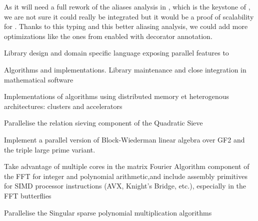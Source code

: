 \begin{workpackage}
\begin{tasklist}
\begin{task}[title=Explorative task: Add support for classes in \Pythran.]
  As it will need a full rework of the aliases analysis in \Pythran, which is
  the keystone of \Pythran, we are not sure it could really
  be integrated but it would be a proof of scalability for \Pythran.
  Thanks to this typing and this better aliasing analysis, we could add more
  optimizations like the ones from \Cython enabled with decorator annotation.
\end{task}
\end{tasklist}

\begin{wpdelivs}
  \begin{wpdeliv}[due=12,id=LinBox-DSL,dissem=PU,nature=R]
    {Library design and domain specific language exposing \Linbox parallel features to \Sage}
  \end{wpdeliv}
  \begin{wpdeliv}[due=24,id=LinBox-algo,dissem=PU,nature=DEM]
    {Algorithms and implementations. Library maintenance and close integration
      in mathematical software}
  \end{wpdeliv}
  \begin{wpdeliv}[due=36,id=LinBox-distributed,dissem=PU,nature=DEM]
    {Implementations of algorithms using distributed memory et heterogenous
      architectures: clusters and accelerators}
  \end{wpdeliv}
  \begin{wpdeliv}[due=3,id=QS-sieving,dissem=PU,nature=DEM]
      {Parallelise the relation sieving component of the Quadratic Sieve}
\end{wpdeliv}
  \begin{wpdeliv}[due=9,id=QS-linalg,dissem=PU,nature=DEM]
      {Implement a parallel version of Block-Wiederman linear algebra over GF2 and the triple large prime variant.}
\end{wpdeliv}
  \begin{wpdeliv}[due=12,id=FFT,dissem=PU,nature=DEM]
    {Take advantage of multiple cores in the matrix Fourier Algorithm component of the FFT
      for integer and polynomial arithmetic,and include assembly primitives for SIMD
      processor instructions (AVX, Knight's Bridge, etc.), especially in the FFT
      butterflies}
\end{wpdeliv}
  \begin{wpdeliv}[due=12,id=singular-polymul,dissem=PU,nature=DEM]
      {Parallelise the Singular sparse polynomial multiplication algorithms}
\end{wpdeliv}
  \begin{wpdeliv}[due=12,id=singular-polyarith,dissem=PU,nature=DEM]

\end{wpdeliv}
\end{wpdelivs}
\end{workpackage}
